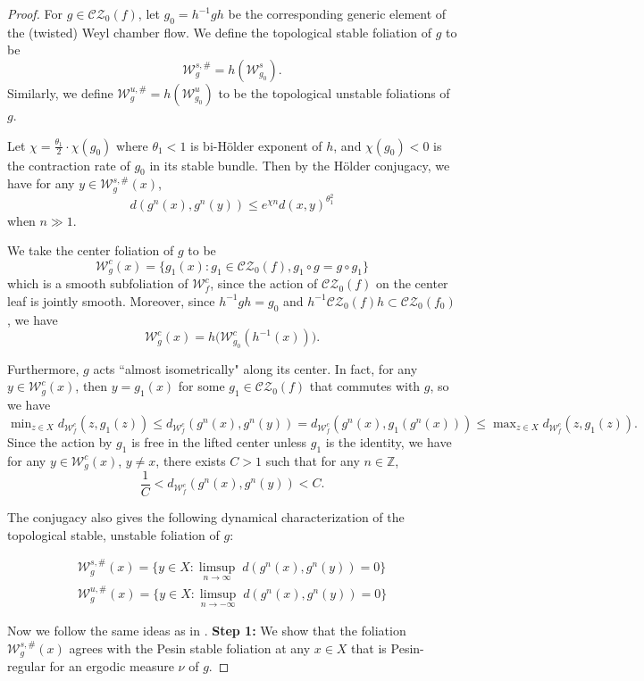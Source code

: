 \documentclass[11pt]{amsart}
\numberwithin{equation}{section}
\newcommand{\Z}{\mathbb{Z}}
\newcommand{\W}{\mathcal{W}}
\newcommand{\CZ}{\mathcal{CZ}}
\theoremstyle{plain}
\begin{document}
\begin{proof}
 For $g\in \CZ_0(f)$, let $g_0=h^{-1}gh$ be the corresponding generic element of the (twisted) Weyl chamber flow. We define the topological stable foliation of $g$ to be 
 $$\W^{s,\#}_g=h(\W^s_{g_0}).$$
 Similarly, we define $\W^{u,\#}_g=h(\W^u_{g_0})$ to be the topological unstable foliations of $g$.

 Let $\chi=\frac{\theta_1}{2} \cdot \chi(g_0)$ where $\theta_1<1$ is bi-H\"older exponent of $h$, and $\chi(g_0)<0$ is the contraction rate of $g_0$ in its stable bundle. Then by the H\"older conjugacy, we have for any $y\in \W^{s,\#}_g(x)$, \begin{equation}\label{equ:gcontract}
 d(g^n(x),g^n(y))\le e^{\chi n} d(x,y)^{\theta_1^2} 
 \end{equation} when $n\gg1$. 

 We take the center foliation of $g$ to be $$\W^c_g(x)=\{g_1(x):g_1\in \CZ_0(f), g_1\circ g=g\circ g_1\}$$ which is a smooth subfoliation of $\W^c_f$, since the action of $\CZ_0(f)$ on the center leaf is jointly smooth. Moreover, since \(h^{-1}gh=g_0\) and \(h^{-1}\CZ_0(f)h\subset \CZ_0(f_0)\), we have
\[
\W^c_g(x)
=
h\bigl(\W^c_{g_0}(h^{-1}(x))\bigr).
\]

Furthermore, $g$ acts ``almost isometrically" along its center. In fact, for any $y\in \W^c_g(x)$, then $y=g_1(x)$ for some $g_1\in \CZ_0(f)$ that commutes with $g$, so we have  $\min_{z\in X} d_{\W^c_f}(z,g_1(z))\le d_{\W^c_f}(g^n(x),g^n(y))=d_{\W^c_f}(g^n(x),g_1(g^n(x)))\le \max_{z\in X} d_{\W^c_f}(z,g_1(z)).$   Since the action by $g_1$ is free in the lifted center unless $g_1$ is the identity, we have for any $y\in \W^c_g(x)$, $y\neq x$, there exists $C>1$ such that for any $n\in \Z$, $$\frac{1}{C}<d_{\W^c_f}(g^n(x),g^n(y))<C.$$

The conjugacy also gives the following dynamical characterization of the topological stable, unstable foliation of $g$: 
 
 \begin{equation}\label{equ:dyncha}
 \begin{split}
 \W^{s,\#}_g(x)=\{y\in X: \limsup_{n\to \infty } \;d(g^n(x),g^n(y))=0\}\\
 \W^{u,\#}_g(x)=\{y\in X: \limsup_{n\to -\infty }\;d(g^n(x),g^n(y))=0\}
 \end{split}
 \end{equation}

Now we follow the same ideas as in \cite{Wang}. 
\textbf{Step 1:} We show that the foliation $\W^{s,\#}_g(x)$ agrees with the Pesin stable foliation at any $x\in X$ that is Pesin-regular for an ergodic measure $\nu$ of $g$. 


\end{proof}
\end{document}
